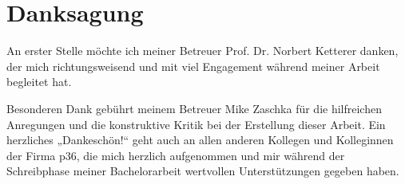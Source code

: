 
\chapter*{Danksagung}

An erster Stelle möchte ich meiner Betreuer Prof. Dr. Norbert Ketterer danken, der mich richtungsweisend und mit viel Engagement während meiner Arbeit begleitet hat.
 
Besonderen Dank gebührt meinem Betreuer Mike Zaschka für die hilfreichen Anregungen und die konstruktive Kritik bei der Erstellung dieser Arbeit. Ein herzliches „Dankeschön!“ geht auch an allen anderen Kollegen und Kolleginnen der Firma p36, die mich herzlich aufgenommen und mir während der Schreibphase meiner Bachelorarbeit wertvollen Unterstützungen gegeben haben. 



